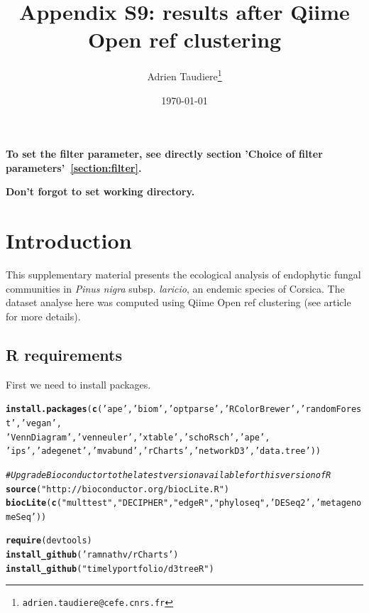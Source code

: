 \documentclass[12pt]{article}\usepackage[]{graphicx}\usepackage[]{color}
\title{Appendix S9: results after Qiime Open ref clustering}
\author{Adrien Taudiere\thanks{\texttt{adrien.taudiere@cefe.cnrs.fr}}}
\affil{{\footnotesize CEFE - Centre d'Ecologie Fonctionnelle et Evolutive, Montpellier: France}}
\date{\today}
\makeatletter
\newcommand{\hlstr}[1]{\textcolor[rgb]{0.192,0.494,0.8}{#1}}%
\newcommand{\hlcom}[1]{\textcolor[rgb]{0.678,0.584,0.686}{\textit{#1}}}%
\newcommand{\hlstd}[1]{\textcolor[rgb]{0.345,0.345,0.345}{#1}}%
\newcommand{\hlkwd}[1]{\textcolor[rgb]{0.737,0.353,0.396}{\textbf{#1}}}%
\newenvironment{kframe}{%
 \def\at@end@of@kframe{}%
 \ifinner\ifhmode%
  \def\at@end@of@kframe{\end{minipage}}%
  \begin{minipage}{\columnwidth}%
 \fi\fi%
 \def\FrameCommand##1{\hskip\@totalleftmargin \hskip-\fboxsep
 \colorbox{shadecolor}{##1}\hskip-\fboxsep
     \hskip-\linewidth \hskip-\@totalleftmargin \hskip\columnwidth}%
 \MakeFramed {\advance\hsize-\width
   \@totalleftmargin\z@ \linewidth\hsize
   \@setminipage}}%
 {\par\unskip\endMakeFramed%
 \at@end@of@kframe}
\newenvironment{knitrout}{}{} %
\numberwithin{figure}{section}
\makeatother
\begin{document}






\maketitle

\vfill
\begin{center}
\textbf{To set the filter parameter, see directly section 'Choice of filter parameters'~\ref{section:filter}.}

\textbf{Don't forgot to set working directory.}
\end{center}

\newpage
\tableofcontents
\newpage


\section{Introduction}

This supplementary material presents the ecological analysis of endophytic fungal communities in \textit{Pinus nigra} subsp. \textit{laricio}, an endemic species of Corsica. The dataset analyse here was computed using Qiime Open ref clustering (see article for more details).

\subsection{R requirements}

First we need to install packages.
\begin{knitrout}\small
{}\color{fgcolor}\begin{kframe}
\begin{alltt}
\hlkwd{install.packages}\hlstd{(}\hlkwd{c}\hlstd{(}\hlstr{'ape'}\hlstd{,} \hlstr{'biom'}\hlstd{,} \hlstr{'optparse'}\hlstd{,} \hlstr{'RColorBrewer'}\hlstd{,} \hlstr{'randomForest'}\hlstd{,}  \hlstr{'vegan'}\hlstd{,}
                  \hlstr{'VennDiagram'}\hlstd{,} \hlstr{'venneuler'}\hlstd{,} \hlstr{'xtable'}\hlstd{,} \hlstr{'schoRsch'}\hlstd{,} \hlstr{'ape'}\hlstd{,}
                 \hlstr{'ips'}\hlstd{,} \hlstr{'adegenet'}\hlstd{,} \hlstr{'mvabund'}\hlstd{,} \hlstr{'rCharts'}\hlstd{,} \hlstr{'networkD3'}\hlstd{,} \hlstr{'data.tree'}\hlstd{))}

\hlcom{# Upgrade Bioconductor to the latest version available for this version of R}
\hlkwd{source}\hlstd{(}\hlstr{"http://bioconductor.org/biocLite.R"}\hlstd{)}
\hlkwd{biocLite}\hlstd{(}\hlkwd{c}\hlstd{(}\hlstr{"multtest"}\hlstd{,} \hlstr{"DECIPHER"}\hlstd{,} \hlstr{"edgeR"}\hlstd{,} \hlstr{"phyloseq"}\hlstd{,} \hlstr{'DESeq2'}\hlstd{,} \hlstr{'metagenomeSeq'}\hlstd{))}

\hlkwd{require}\hlstd{(devtools)}
\hlkwd{install_github}\hlstd{(}\hlstr{'ramnathv/rCharts'}\hlstd{)}
\hlkwd{install_github}\hlstd{(}\hlstr{"timelyportfolio/d3treeR"}\hlstd{)}
\end{alltt}
\end{kframe}
\end{knitrout}
\end{document}
